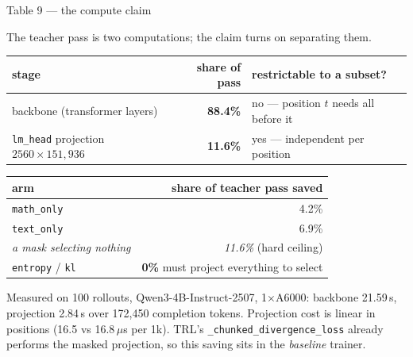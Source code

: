 \documentclass[aspectratio=169,11pt]{beamer}
\newcommand{\up}[1]{\textcolor{good}{\textbf{#1}}}
\newcommand{\dn}[1]{\textcolor{bad}{\textbf{#1}}}
\newcommand{\aside}[1]{{\footnotesize\textcolor{mut}{#1}}}
\begin{document}
\begin{frame}{Table 9 --- the compute claim}

The teacher pass is two computations; the claim turns on separating them.

\vspace{0.6em}
\centering
{\small
\begin{tabular}{@{}lrl@{}}
\toprule
\textbf{stage} & \textbf{share of pass} & \textbf{restrictable to a subset?} \\
\midrule
backbone (transformer layers)     & \dn{88.4\%} & no --- position $t$ needs all before it \\
\texttt{lm\_head} projection $2560\times151{,}936$ & \up{11.6\%} & yes --- independent per position \\
\bottomrule
\end{tabular}}

\vspace{0.9em}
{\small
\begin{tabular}{@{}lr@{}}
\toprule
\textbf{arm} & \textbf{share of teacher pass saved} \\
\midrule
\texttt{math\_only} & 4.2\% \\
\texttt{text\_only} & 6.9\% \\
\emph{a mask selecting nothing} & \emph{11.6\%} \aside{(hard ceiling)} \\
\texttt{entropy} / \texttt{kl} & \dn{0\%} \aside{must project everything to select} \\
\bottomrule
\end{tabular}}

\flushleft
\vspace{0.8em}
\aside{Measured on 100 rollouts, Qwen3-4B-Instruct-2507, 1$\times$A6000: backbone 21.59\,s,
projection 2.84\,s over 172{,}450 completion tokens. Projection cost is linear in positions
(16.5 vs 16.8\,$\mu$s per 1k). TRL's \texttt{\_chunked\_divergence\_loss} already performs the
masked projection, so this saving sits in the \emph{baseline} trainer.}

\end{frame}
\end{document}

